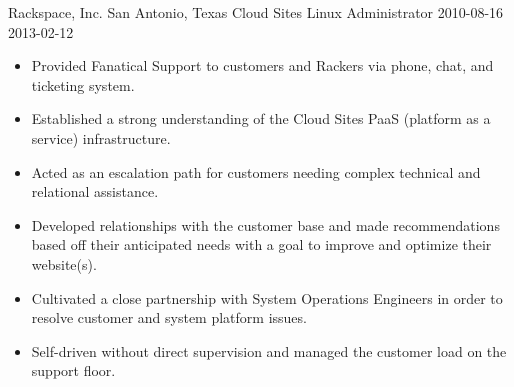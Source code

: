\roleheader
    {Rackspace, Inc.}
    {San Antonio, Texas}
    {Cloud Sites Linux Administrator }
    {2010-08-16}
    {2013-02-12}

\begin{itemize} \itemsep 0pt
    \item Provided Fanatical Support to customers and Rackers via phone, chat, and ticketing system.
    \item Established a strong understanding of the Cloud Sites PaaS (platform as a service) infrastructure.
    \item Acted as an escalation path for customers needing complex technical and relational assistance.
    \item Developed relationships with the customer base and made recommendations based off their anticipated needs with a goal to improve and optimize their website(s).
    \item Cultivated a close partnership with System Operations Engineers in order to resolve customer and system platform issues.
    \item Self-driven without direct supervision and managed the customer load on the support floor.
\end{itemize}